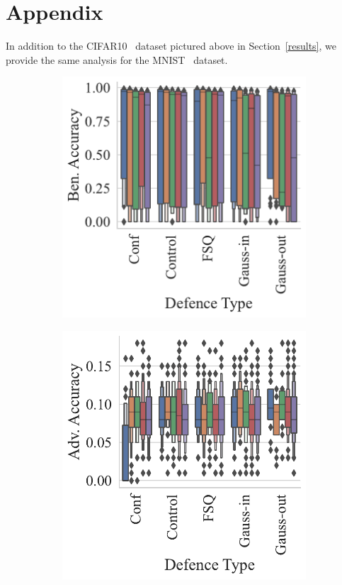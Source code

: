 \section{Appendix}
\label{appendix}
In addition to the CIFAR10~\citep{cifar} dataset pictured above in Section~\ref{results}, we provide the same analysis for the MNIST~\citep{mnist} dataset.

\begin{figure}[h!]
\begin{subfigure}[]{0.27\textwidth}
    \centering
    \includegraphics[width=\textwidth]{mnist/ben_accuracy_vs_defence_type.pdf}
\end{subfigure}
\begin{subfigure}[]{0.27\textwidth}
    \centering
    \includegraphics[width=\textwidth]{mnist/adv_accuracy_vs_defence_type.pdf}

\end{subfigure}
\end{figure}
